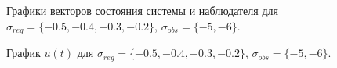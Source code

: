 \begin{figure}[!h]
	\caption{Графики векторов состояния системы и наблюдателя для $\sigma_{reg} = \{ -0.5, -0.4, -0.3, -0.2\}$, $\sigma_{obs}= \{-5, -6 \}$.}
	\label{3_x_k3l2}
\end{figure}

\begin{figure}[!h]
	\caption{График $u(t)$ для $\sigma_{reg} = \{ -0.5, -0.4, -0.3, -0.2\}$, $\sigma_{obs}= \{-5, -6 \}$.}
	\label{3_u_k3l2}
\end{figure}

\endinput